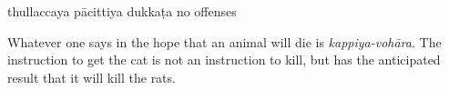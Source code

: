 \begin{exam}{\autoExamName}
\begin{problem*}
\begin{parts}
    \begin{answers}{4}
      \bChoices
       thullaccaya \eAns
       pācittiya\eAns
       dukkaṭa\eAns
       no offenses\eAns
      \eChoices
    \end{answers}

    \begin{solution}
      Whatever one says in the hope that an animal will die is \emph{kappiya-vohāra}.
      The instruction to get the cat is not an instruction to kill,
      but has the anticipated result that it will kill the rats.
    \end{solution}

  \end{parts}

\end{problem*}

\end{exam}








